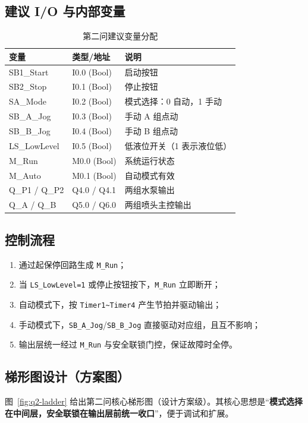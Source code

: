 \documentclass[a4paper,12pt]{article}
\begin{document}
\subsection{建议 I/O 与内部变量}
\begin{table}[H]
  \centering
  \caption{第二问建议变量分配}
  \begin{tabular}{p{3cm}p{3cm}p{7.2cm}}
    \toprule
    变量 & 类型/地址 & 说明 \\
    \midrule
    SB1\_Start & I0.0 (Bool) & 启动按钮 \\
    SB2\_Stop & I0.1 (Bool) & 停止按钮 \\
    SA\_Mode & I0.2 (Bool) & 模式选择：0 自动，1 手动 \\
    SB\_A\_Jog & I0.3 (Bool) & 手动 A 组点动 \\
    SB\_B\_Jog & I0.4 (Bool) & 手动 B 组点动 \\
    LS\_LowLevel & I0.5 (Bool) & 低液位开关（1 表示液位低） \\
    M\_Run & M0.0 (Bool) & 系统运行状态 \\
    M\_Auto & M0.1 (Bool) & 自动模式有效 \\
    Q\_P1 / Q\_P2 & Q4.0 / Q4.1 & 两组水泵输出 \\
    Q\_A / Q\_B & Q5.0 / Q6.0 & 两组喷头主控输出 \\
    \bottomrule
  \end{tabular}
\end{table}

\subsection{控制流程}
\begin{enumerate}[leftmargin=2em]
  \item 通过起保停回路生成 \texttt{M\_Run}；
  \item 当 \texttt{LS\_LowLevel=1} 或停止按钮按下，\texttt{M\_Run} 立即断开；
  \item 自动模式下，按 \texttt{Timer1\textasciitilde Timer4} 产生节拍并驱动输出；
  \item 手动模式下，\texttt{SB\_A\_Jog}/\texttt{SB\_B\_Jog} 直接驱动对应组，且互不影响；
  \item 输出层统一经过 \texttt{M\_Run} 与安全联锁门控，保证故障时全停。
\end{enumerate}

\subsection{梯形图设计（方案图）}
图~\ref{fig:q2-ladder} 给出第二问核心梯形图（设计方案级）。其核心思想是“\textbf{模式选择在中间层，安全联锁在输出层前统一收口}”，便于调试和扩展。
\end{document}
